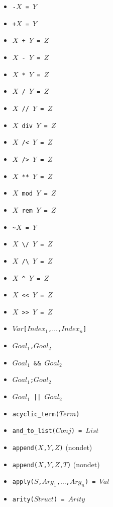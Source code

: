 \documentclass[10pt]{article}
\begin{document}
\begin{multicols}{2}
\begin{scriptsize}
\begin{itemize}
    \item {\tt \verb+-+$X$ = $Y$}
    \item {\tt \verb-+-$X$ = $Y$}
    \item {\tt $X$ \verb-+- $Y$ = $Z$} 
    \item {\tt $X$ \verb+-+ $Y$ = $Z$} 
    \item {\tt $X$ \verb+*+ $Y$ = $Z$} 
    \item {\tt $X$ \verb+/+ $Y$ = $Z$} 
    \item {\tt $X$ \verb+//+ $Y$ = $Z$} 
    \item \texttt{$X$ div $Y$ = $Z$} 
    \item {\tt $X$ \verb+/<+ $Y$ = $Z$} 
    \item {\tt $X$ \verb+/>+ $Y$ = $Z$} 
    \item {\tt $X$ \verb+**+ $Y$ = $Z$} 
    \item \texttt{$X$ mod $Y$ = $Z$} 
    \item \texttt{$X$ rem $Y$ = $Z$} 
    \item {\tt \verb+~+$X$ = $Y$} 
    \item {\tt $X$ \verb+\/+ $Y$ = $Z$} 
    \item {\tt $X$ \verb+/\+ $Y$ = $Z$} 
    \item {\tt $X$ \verb+^+ $Y$ = $Z$} 
    \item {\tt $X$ \verb+<<+ $Y$ = $Z$} 
    \item {\tt $X$ \verb+>>+ $Y$ = $Z$} 
    \item {\tt $Var$\verb+[+$Index_1$,$\ldots$,$Index_n$\verb+]+}
    \item \texttt{$Goal_1$,$Goal_2$}
    \item \texttt{$Goal_1$ \&\& $Goal_2$}
    \item \texttt{$Goal_1$;$Goal_2$}
    \item \texttt{$Goal_1$ || $Goal_2$}
    \item \texttt{acyclic\_term($Term$)}
    \item \texttt{and\_to\_list($Conj$) = $List$}
    \item \texttt{append($X$,$Y$,$Z$)}  (nondet)
    \item \texttt{append($X$,$Y$,$Z$,$T$)}  (nondet)
    \item \texttt{apply($S$,$Arg_1$,$\ldots$,$Arg_n$) = $Val$} 
    \item \texttt{arity($Struct$) = $Arity$}

\end{itemize}
\end{scriptsize}
\end{multicols}
\end{document}
